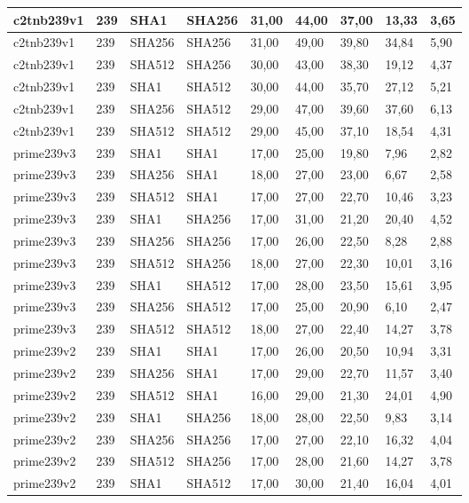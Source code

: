 \begin{longtable}{| l | l | l | l | l |l |l |l |l |}
c2tnb239v1 & 239 & SHA1 & SHA256 & 31,00 & 44,00 & 37,00 & 13,33 & 3,65 \\ \hline 
c2tnb239v1 & 239 & SHA256 & SHA256 & 31,00 & 49,00 & 39,80 & 34,84 & 5,90 \\ \hline 
c2tnb239v1 & 239 & SHA512 & SHA256 & 30,00 & 43,00 & 38,30 & 19,12 & 4,37 \\ \hline 
c2tnb239v1 & 239 & SHA1 & SHA512 & 30,00 & 44,00 & 35,70 & 27,12 & 5,21 \\ \hline 
c2tnb239v1 & 239 & SHA256 & SHA512 & 29,00 & 47,00 & 39,60 & 37,60 & 6,13 \\ \hline 
c2tnb239v1 & 239 & SHA512 & SHA512 & 29,00 & 45,00 & 37,10 & 18,54 & 4,31 \\ \hline 
prime239v3 & 239 & SHA1 & SHA1 & 17,00 & 25,00 & 19,80 & 7,96 & 2,82 \\ \hline 
prime239v3 & 239 & SHA256 & SHA1 & 18,00 & 27,00 & 23,00 & 6,67 & 2,58 \\ \hline 
prime239v3 & 239 & SHA512 & SHA1 & 17,00 & 27,00 & 22,70 & 10,46 & 3,23 \\ \hline 
prime239v3 & 239 & SHA1 & SHA256 & 17,00 & 31,00 & 21,20 & 20,40 & 4,52 \\ \hline 
prime239v3 & 239 & SHA256 & SHA256 & 17,00 & 26,00 & 22,50 & 8,28 & 2,88 \\ \hline 
prime239v3 & 239 & SHA512 & SHA256 & 18,00 & 27,00 & 22,30 & 10,01 & 3,16 \\ \hline 
prime239v3 & 239 & SHA1 & SHA512 & 17,00 & 28,00 & 23,50 & 15,61 & 3,95 \\ \hline 
prime239v3 & 239 & SHA256 & SHA512 & 17,00 & 25,00 & 20,90 & 6,10 & 2,47 \\ \hline 
prime239v3 & 239 & SHA512 & SHA512 & 18,00 & 27,00 & 22,40 & 14,27 & 3,78 \\ \hline 
prime239v2 & 239 & SHA1 & SHA1 & 17,00 & 26,00 & 20,50 & 10,94 & 3,31 \\ \hline 
prime239v2 & 239 & SHA256 & SHA1 & 17,00 & 29,00 & 22,70 & 11,57 & 3,40 \\ \hline 
prime239v2 & 239 & SHA512 & SHA1 & 16,00 & 29,00 & 21,30 & 24,01 & 4,90 \\ \hline 
prime239v2 & 239 & SHA1 & SHA256 & 18,00 & 28,00 & 22,50 & 9,83 & 3,14 \\ \hline 
prime239v2 & 239 & SHA256 & SHA256 & 17,00 & 27,00 & 22,10 & 16,32 & 4,04 \\ \hline 
prime239v2 & 239 & SHA512 & SHA256 & 17,00 & 28,00 & 21,60 & 14,27 & 3,78 \\ \hline 
prime239v2 & 239 & SHA1 & SHA512 & 17,00 & 30,00 & 21,40 & 16,04 & 4,01 \\ \hline 

\end{longtable}

